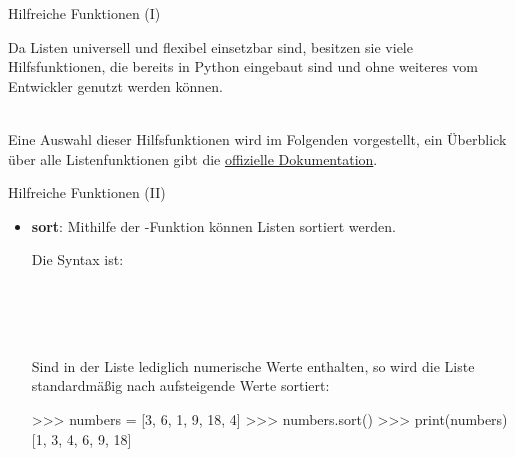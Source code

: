         \begin{frame}[fragile]{Hilfreiche Funktionen (I)}
            
            Da Listen universell und flexibel einsetzbar sind, besitzen sie viele Hilfsfunktionen, die bereits in Python eingebaut sind und ohne weiteres vom Entwickler genutzt werden können. \\~\
            
            Eine Auswahl dieser Hilfsfunktionen wird im Folgenden vorgestellt, ein Überblick über alle Listenfunktionen gibt die \href{https://docs.python.org/3/tutorial/datastructures.html#more-on-lists}{offizielle Dokumentation}.
            
        \end{frame}
        
         \begin{frame}[fragile]{Hilfreiche Funktionen (II)}
            \begin{itemize}
                \item \textbf{sort}: Mithilfe der -Funktion können Listen sortiert werden. 
                
                Die Syntax ist: \\~\
                
                 \\~\
                
                Sind in der Liste lediglich numerische Werte enthalten, so wird die Liste standardmäßig nach aufsteigende Werte sortiert:
                
\begin{pyconcode}
>>> numbers = [3, 6, 1, 9, 18, 4]
>>> numbers.sort()
>>> print(numbers)
[1, 3, 4, 6, 9, 18]
\end{pyconcode} 
            \end{itemize}
         \end{frame}
         
